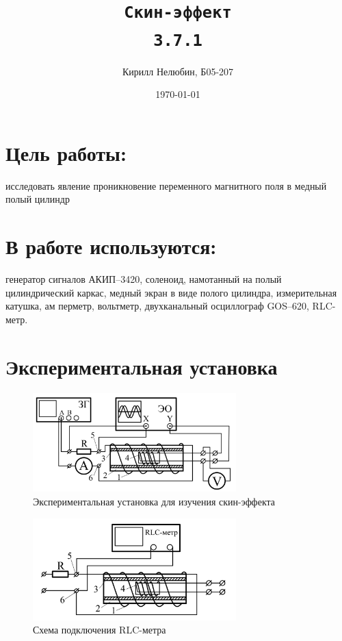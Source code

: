 \documentclass[12pt,a4paper]{article}
\title{\texttt{Скин-эффект \\ 3.7.1}}
\author{Кирилл Нелюбин, Б05-207}
\date{\today}
\begin{document}
\maketitle

\section{Цель работы:}
исследовать явление проникновение переменного магнитного поля в медный полый цилиндр
\section{В работе используются:}
генератор сигналов АКИП–3420, соленоид, намотанный на полый
цилиндрический каркас, медный экран в виде полого цилиндра, измерительная катушка, ам
перметр, вольтметр, двухканальный осциллограф GOS–620, RLC-метр.

\section*{Экспериментальная установка}
\begin{figure}[H]
  \includegraphics*[width=0.7\textwidth]{24_12_48.png}
  \caption*{Экспериментальная установка для изучения скин-эффекта}
\end{figure}
\begin{figure}[H]
  \includegraphics*[width=0.7\textwidth]{24_12_59.png}
  \caption*{Схема подключения RLC-метра}
\end{figure}
\end{document}
